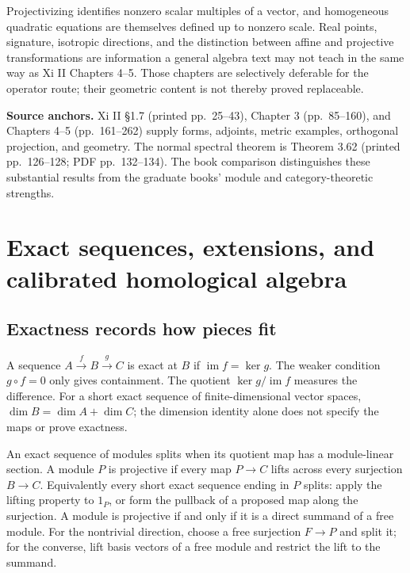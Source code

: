 \documentclass[
  11pt,
]{article}
\begin{document}
Projectivizing identifies nonzero scalar multiples of a vector, and
homogeneous quadratic equations are themselves defined up to nonzero
scale. Real points, signature, isotropic directions, and the distinction
between affine and projective transformations are information a general
algebra text may not teach in the same way as Xi II Chapters 4--5. Those
chapters are selectively deferable for the operator route; their
geometric content is not thereby proved replaceable.

\textbf{Source anchors.} Xi II §1.7 (printed pp.~25--43), Chapter 3
(pp.~85--160), and Chapters 4--5 (pp.~161--262) supply forms, adjoints,
metric examples, orthogonal projection, and geometry. The normal
spectral theorem is Theorem 3.62 (printed pp.~126--128; PDF
pp.~132--134). The book comparison distinguishes these substantial
results from the graduate books' module and category-theoretic
strengths.

\section{Exact sequences, extensions, and calibrated homological
algebra}\label{exact-sequences-extensions-and-calibrated-homological-algebra}

\subsection{Exactness records how pieces
fit}\label{exactness-records-how-pieces-fit}

A sequence \(A\xrightarrow{f}B\xrightarrow{g}C\) is exact at \(B\) if
\(\operatorname{im}f=\ker g\). The weaker condition \(g\circ f=0\) only
gives containment. The quotient \(\ker g/\operatorname{im}f\) measures
the difference. For a short exact sequence of finite-dimensional vector
spaces, \(\dim B=\dim A+\dim C\); the dimension identity alone does not
specify the maps or prove exactness.

An exact sequence of modules splits when its quotient map has a
module-linear section. A module \(P\) is projective if every map
\(P\to C\) lifts across every surjection \(B\to C\). Equivalently every
short exact sequence ending in \(P\) splits: apply the lifting property
to \(1_P\), or form the pullback of a proposed map along the surjection.
A module is projective if and only if it is a direct summand of a free
module. For the nontrivial direction, choose a free surjection
\(F\to P\) and split it; for the converse, lift basis vectors of a free
module and restrict the lift to the summand.
\end{document}
